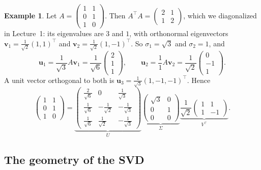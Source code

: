 \documentclass[11pt]{article}
\theoremstyle{definition}
\newtheorem{example}[definition]{Example}
\theoremstyle{plain}
\theoremstyle{remark}
\begin{document}
\begin{example}\label{ex:svd-3x2}
    Let $A = \begin{pmatrix} 1 & 1 \\ 0 & 1 \\ 1 & 0 \end{pmatrix}$. Then $A^\top A = \begin{pmatrix} 2 & 1 \\ 1 & 2 \end{pmatrix}$, which we diagonalized in Lecture~1: its eigenvalues are $3$ and $1$, with orthonormal eigenvectors $\mathbf{v}_1 = \frac{1}{\sqrt{2}}(1, 1)^\top$ and $\mathbf{v}_2 = \frac{1}{\sqrt{2}}(1, -1)^\top$. So $\sigma_1 = \sqrt{3}$ and $\sigma_2 = 1$, and
    \[\mathbf{u}_1 = \frac{1}{\sqrt{3}} A \mathbf{v}_1 = \frac{1}{\sqrt{6}} \begin{pmatrix} 2 \\ 1 \\ 1 \end{pmatrix}, \qquad \mathbf{u}_2 = \frac{1}{1} A \mathbf{v}_2 = \frac{1}{\sqrt{2}} \begin{pmatrix} 0 \\ -1 \\ 1 \end{pmatrix}.\]
    A unit vector orthogonal to both is $\mathbf{u}_3 = \frac{1}{\sqrt{3}}(1, -1, -1)^\top$. Hence
    \[\begin{pmatrix} 1 & 1 \\ 0 & 1 \\ 1 & 0 \end{pmatrix} = \underbrace{\begin{pmatrix} \frac{2}{\sqrt{6}} & 0 & \frac{1}{\sqrt{3}} \\ \frac{1}{\sqrt{6}} & -\frac{1}{\sqrt{2}} & -\frac{1}{\sqrt{3}} \\ \frac{1}{\sqrt{6}} & \frac{1}{\sqrt{2}} & -\frac{1}{\sqrt{3}} \end{pmatrix}}_{U} \underbrace{\begin{pmatrix} \sqrt{3} & 0 \\ 0 & 1 \\ 0 & 0 \end{pmatrix}}_{\Sigma} \underbrace{\frac{1}{\sqrt{2}}\begin{pmatrix} 1 & 1 \\ 1 & -1 \end{pmatrix}}_{V^\top}.\]
\end{example}

\subsection{The geometry of the SVD}
\end{document}
